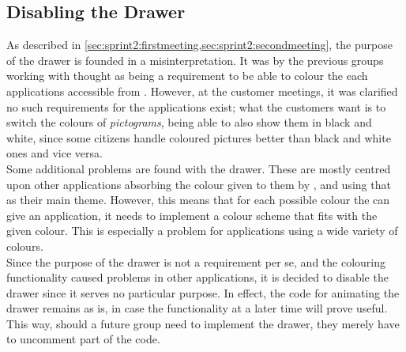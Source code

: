\subsection{Disabling the Drawer}
As described in \cref{sec:sprint2:firstmeeting,sec:sprint2:secondmeeting}, the purpose of the drawer is founded in a misinterpretation.
It was by the previous groups working with \launcher thought as being a requirement to be able to colour the each \giraf applications accessible from \launcher.
However, at the customer meetings, it was clarified no such requirements for the applications exist;
what the customers want is to switch the colours of \textit{pictograms}, being able to also show them in black and white, since some citizens handle coloured pictures better than black and white ones and vice versa.\\

Some additional problems are found with the drawer.
These are mostly centred upon other applications absorbing the colour given to them by \launcher, and using that as their main theme.
However, this means that for each possible colour the \launcher can give an application, it needs to implement a colour scheme that fits with the given colour.
This is especially a problem for applications using a wide variety of colours.\\

Since the purpose of the drawer is not a requirement per se, and the colouring functionality caused problems in other applications, it is decided to disable the drawer since it serves no particular purpose.
In effect, the code for animating the drawer remains as is, in case the functionality at a later time will prove useful.
This way, should a future group need to implement the drawer, they merely have to uncomment part of the code.